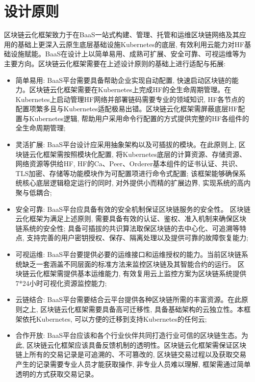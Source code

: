 \section{设计原则}\label{section: framework_characteristics}

区块链云化框架致力于在BaaS一站式构建、管理、托管和运维区块链网络及其应用的基础上更深入云原生底层基础设施Kubernetes的底层, 有效利用云能力对HF基础设施赋能。BaaS在设计上以简单易用、成熟可扩展、安全可靠、可视运维等为主要方向\footnotemark[1]。区块链云化框架需要在上述设计原则的基础上进行适配与拓展:

\begin{itemize}[itemindent=2em]
    \item 简单易用: BaaS平台需要具备帮助企业实现自动配置, 快速启动区块链的能力。区块链云化框架需要在Kubernetes上完成HF的全生命周期管理。在Kubernetes上启动管理HF网络并部署链码需要专业的领域知识, HF各节点的配置项繁多且与Kubernetes适配极易出错。区块链云化框架需屏蔽底层HF配置与Kubernetes逻辑, 帮助用户采用命令行配置的方式提供完整的HF各组件的全生命周期管理;

    \item 灵活扩展: BaaS平台设计应采用抽象架构以及可插拔的模块。在此原则上, 区块链云化框架需按照模块化配置, 将Kubernetes底层的计算资源、存储资源、网络资源等供给HF, HF的Ca、Peer、Orderer基本组件的证书认证、共识、TLS加密、存储等功能模块作为可配置项进行命令式配置; 该框架能够确保系统核心底层逻辑稳定运行的同时, 对外提供小而精的扩展边界, 实现系统的高内聚与低耦合;

    \item 安全可靠: BaaS平台应具备有效的安全机制保证区块链服务的安全性。 区块链云化框架为满足上述原则, 需要具备有效的认证、鉴权、准入机制来确保区块链系统的安全性; 具备可插拔的共识算法取保区块链的去中心化、可追溯等特点, 支持完善的用户密钥授权、保存、隔离处理以及提供可靠的故障恢复能力;

    \item 可视运维: BaaS平台要提供必要的运维接口和运维授权的能力。当前区块链系统缺乏一套涵盖不同层面的标准方法来监控区块链及其智能合约的运行\cite{zhangfuli2021smartcontract}。 区块链云化框架需提供基本运维能力, 有效复用云上监控方案为区块链系统提供7*24小时可视化资源监控能力;

    \item 云链结合: BaaS平台需要结合云平台提供各种区块链所需的丰富资源。在此原则之上, 区块链云化框架需要具备高可迁移性, 具备基础架构的云独立性。本框架依托Kubernetes, 可以方便的迁移到支持Kubernetes的任何云;

    \item 合作开放: BaaS平台应该和各个行业伙伴共同打造行业可信的区块链生态。为此, 区块链云化框架应该具备反馈机制的透明性。区块链云化框架需保证区块链上所有的交易记录是可追溯的、不可篡改的, 区块链交易过程以及获取交易产生的记录需要专业人员才能获取操作, 非专业人员难以理解, 框架需通过简单透明的方式获取交易记录。
\end{itemize}

